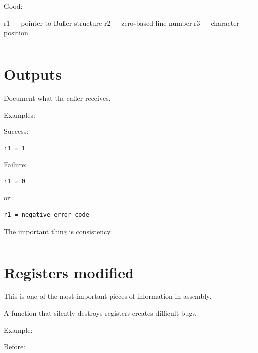 \documentclass[
  oneside,
  openany]{book}
\newenvironment{Shaded}{\begin{snugshade}}{\end{snugshade}}
\newcommand{\NormalTok}[1]{#1}
\newcommand{\OperatorTok}[1]{\textcolor[rgb]{0.81,0.36,0.00}{\textbf{#1}}}
\begin{document}
Good:

\begin{Shaded}
\begin{Highlighting}[]
\NormalTok{r1 }\OperatorTok{=}\NormalTok{ pointer to Buffer structure}
\NormalTok{r2 }\OperatorTok{=}\NormalTok{ zero}\OperatorTok{{-}}\NormalTok{based line number}
\NormalTok{r3 }\OperatorTok{=}\NormalTok{ character position}
\end{Highlighting}
\end{Shaded}

\begin{center}\rule{0.5\linewidth}{0.5pt}\end{center}

\hypertarget{outputs}{%
\section{Outputs}\label{outputs}}

Document what the caller receives.

Examples:

Success:

\begin{verbatim}
r1 = 1
\end{verbatim}

Failure:

\begin{verbatim}
r1 = 0
\end{verbatim}

or:

\begin{verbatim}
r1 = negative error code
\end{verbatim}

The important thing is consistency.

\begin{center}\rule{0.5\linewidth}{0.5pt}\end{center}

\hypertarget{registers-modified}{%
\section{Registers modified}\label{registers-modified}}

This is one of the most important pieces of information in assembly.

A function that silently destroys registers creates difficult bugs.

Example:

Before:
\end{document}
